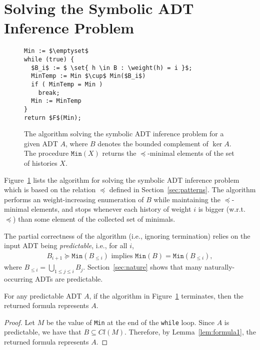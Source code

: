 \section{Solving the Symbolic ADT Inference Problem}

\begin{figure}
\begin{lstlisting}
Min := $\emptyset$
while (true) {
  $B_i$ := $ \set{ h \in B : \weight(h) = i }$;
  MinTemp := Min $\cup$ Min($B_i$)
  if ( MinTemp = Min )
    break;
  Min := MinTemp
}
return $F$(Min);
\end{lstlisting}
\caption{The algorithm solving the symbolic ADT inference problem for a given ADT $A$, where $B$ denotes the bounded complement of $\ker A$. The procedure $\texttt{Min}(X)$ returns the $\preceq$-minimal elements of the set of histories $X$. %
} 
\label{fig:algorithm}
\end{figure}

Figure~\ref{fig:algorithm} lists the algorithm for solving the symbolic ADT inference problem which is based on the relation $\preceq$ 
defined in Section~\ref{sec:patterns}.
The algorithm performs an weight-increasing enumeration of $B$ while maintaining the
$\preceq$-minimal elements, and stops whenever each history of weight $i$ is bigger (w.r.t. $\preceq$) than some
element of the collected set of minimals.

The partial correctness of the algorithm (i.e., ignoring termination) relies on the input ADT being \emph{predictable}, i.e.,
for all $i$,
\begin{align*}
B_{i+1} \succeq \texttt{Min}(B_{\leq i}) \mbox{ implies } \texttt{Min}(B) = \texttt{Min}(B_{\leq i}),
\end{align*}
where $B_{\leq i}=\bigcup_{1\leq j\leq i}B_j$.
Section~\ref{sec:nature} shows that many naturally-occurring ADTs are predictable.

\begin{theorem}\label{th:corr1}
For any predictable ADT $A$, if the algorithm in Figure~\ref{fig:algorithm} terminates, then the returned formula represents $A$.
\end{theorem}
\begin{proof}
Let $M$ be the value of \texttt{Min} at the end of the \texttt{while} loop.
Since $A$ is predictable, we have that $B \subseteq Cl(M)$. %
Therefore, by Lemma~\ref{lem:formula1}, the returned formula represents $A$.
\end{proof}

